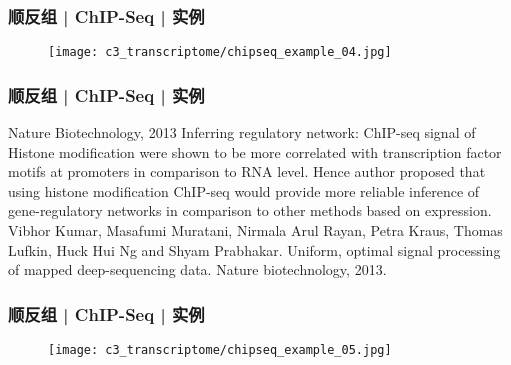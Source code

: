 \begin{frame}
  \frametitle{顺反组 | ChIP-Seq | 实例}
  \begin{figure}
    \centering
    \texttt{[image: c3\_transcriptome/chipseq\_example\_04.jpg]}
  \end{figure}
\end{frame}

\begin{frame}
  \frametitle{顺反组 | ChIP-Seq | 实例}
  \begin{block}{Nature Biotechnology, 2013}
  Inferring regulatory network: ChIP-seq signal of Histone modification were shown to be more correlated with transcription factor motifs at promoters in comparison to RNA level. Hence author proposed that using histone modification ChIP-seq would provide more reliable inference of gene-regulatory networks in comparison to other methods based on expression.\\
  \vspace{0.5em}
  Vibhor Kumar, Masafumi Muratani, Nirmala Arul Rayan, Petra Kraus, Thomas Lufkin, Huck Hui Ng and Shyam Prabhakar. Uniform, optimal signal processing of mapped deep-sequencing data. Nature biotechnology, 2013.
  \end{block}
\end{frame}

\begin{frame}
  \frametitle{顺反组 | ChIP-Seq | 实例}
  \begin{figure}
    \centering
    \texttt{[image: c3\_transcriptome/chipseq\_example\_05.jpg]}
  \end{figure}
\end{frame}

